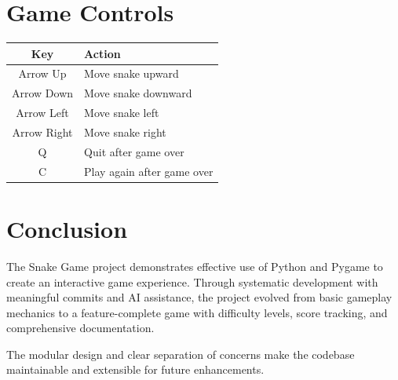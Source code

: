 \documentclass[12pt,a4paper]{article}
\begin{document}
\section{Game Controls}

\begin{tabular}{|c|l|}
\hline
\textbf{Key} & \textbf{Action} \\
\hline
Arrow Up & Move snake upward \\
Arrow Down & Move snake downward \\
Arrow Left & Move snake left \\
Arrow Right & Move snake right \\
Q & Quit after game over \\
C & Play again after game over \\
\hline
\end{tabular}

\section{Conclusion}

The Snake Game project demonstrates effective use of Python and Pygame to create an interactive game experience. Through systematic development with meaningful commits and AI assistance, the project evolved from basic gameplay mechanics to a feature-complete game with difficulty levels, score tracking, and comprehensive documentation.

The modular design and clear separation of concerns make the codebase maintainable and extensible for future enhancements.
\end{document}
